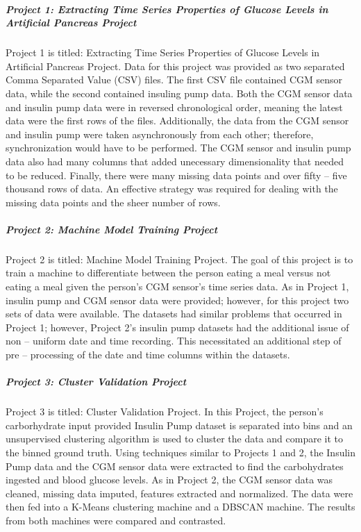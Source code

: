 \subparagraph{Project 1: Extracting Time Series Properties of Glucose Levels in Artificial Pancreas Project}

Project 1 is titled:  Extracting Time Series Properties of Glucose Levels in Artificial Pancreas Project.  Data for this project was provided as two separated Comma Separated Value (CSV) files.  The first CSV file contained CGM sensor data, while the second contained insuling pump data.  Both the CGM sensor data and insulin pump data were in reversed chronological order, meaning the latest data were the first rows of the files.  Additionally, the data from the CGM sensor and insulin pump were taken asynchronously from each other; therefore, synchronization would have to be performed.  The CGM sensor and insulin pump data also had many columns that added unecessary dimensionality that needed to be reduced.  Finally, there were many missing data points and over fifty -- five thousand rows of data.  An effective strategy was required for dealing with the missing data points and the sheer number of rows.

\subparagraph{Project 2: Machine Model Training Project}

Project 2 is titled:  Machine Model Training Project.  The goal of this project is to train a machine to differentiate between the person eating a meal versus not eating a meal given the person's CGM sensor's time series data.  As in Project 1, insulin pump and CGM sensor data were provided; however, for this project two sets of data were available.  The datasets had similar problems that occurred in Project 1; however, Project 2's insulin pump datasets had the additional issue of non -- uniform date and time recording.  This necessitated an additional step of pre -- processing of the date and time columns within the datasets.

\subparagraph{Project 3: Cluster Validation Project}

Project 3 is titled: Cluster Validation Project.  In this Project, the person's carborhydrate input provided Insulin Pump dataset is separated into bins and an unsupervised clustering algorithm is used to cluster the data and compare it to the binned ground truth.  Using techniques similar to Projects 1 and 2, the Insulin Pump data and the CGM sensor data were extracted to find the carbohydrates ingested and blood glucose levels.  As in Project 2, the CGM sensor data was cleaned, missing data imputed, features extracted and normalized.  The data were then fed into a K-Means clustering machine and a DBSCAN machine.  The results from both machines were compared and contrasted.

